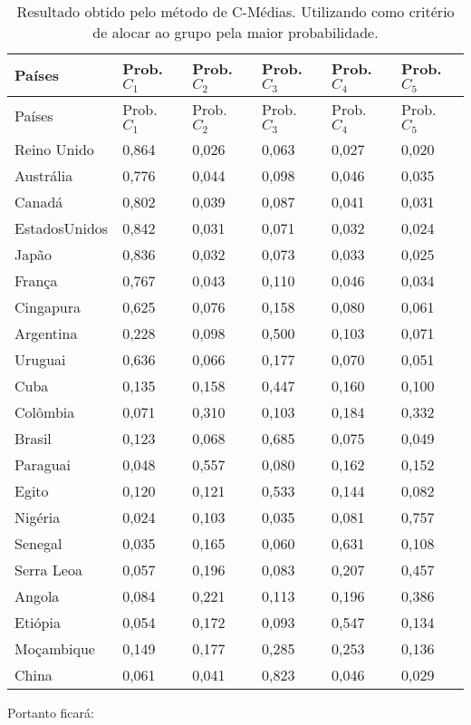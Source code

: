 \documentclass[
  openany]{book}
\begin{document}
\begin{longtable}[]{@{}llllll@{}}
\caption{\label{tab:excmeans} Resultado obtido pelo método de C-Médias. Utilizando como critério de alocar ao grupo pela maior probabilidade.}\tabularnewline
\toprule
Países & Prob. \(C_1\) & Prob. \(C_2\) & Prob. \(C_3\) & Prob. \(C_4\) & Prob. \(C_5\)\tabularnewline
\midrule
\endfirsthead
\toprule
Países & Prob. \(C_1\) & Prob. \(C_2\) & Prob. \(C_3\) & Prob. \(C_4\) & Prob. \(C_5\)\tabularnewline
\midrule
\endhead
Reino Unido & 0,864 & 0,026 & 0,063 & 0,027 & 0,020\tabularnewline
Austrália & 0,776 & 0,044 & 0,098 & 0,046 & 0,035\tabularnewline
Canadá & 0,802 & 0,039 & 0,087 & 0,041 & 0,031\tabularnewline
EstadosUnidos & 0,842 & 0,031 & 0,071 & 0,032 & 0,024\tabularnewline
Japão & 0,836 & 0,032 & 0,073 & 0,033 & 0,025\tabularnewline
França & 0,767 & 0,043 & 0,110 & 0,046 & 0,034\tabularnewline
Cingapura & 0,625 & 0,076 & 0,158 & 0,080 & 0,061\tabularnewline
Argentina & 0,228 & 0,098 & 0,500 & 0,103 & 0,071\tabularnewline
Uruguai & 0,636 & 0,066 & 0,177 & 0,070 & 0,051\tabularnewline
Cuba & 0,135 & 0,158 & 0,447 & 0,160 & 0,100\tabularnewline
Colômbia & 0,071 & 0,310 & 0,103 & 0,184 & 0,332\tabularnewline
Brasil & 0,123 & 0,068 & 0,685 & 0,075 & 0,049\tabularnewline
Paraguai & 0,048 & 0,557 & 0,080 & 0,162 & 0,152\tabularnewline
Egito & 0,120 & 0,121 & 0,533 & 0,144 & 0,082\tabularnewline
Nigéria & 0,024 & 0,103 & 0,035 & 0,081 & 0,757\tabularnewline
Senegal & 0,035 & 0,165 & 0,060 & 0,631 & 0,108\tabularnewline
Serra Leoa & 0,057 & 0,196 & 0,083 & 0,207 & 0,457\tabularnewline
Angola & 0,084 & 0,221 & 0,113 & 0,196 & 0,386\tabularnewline
Etiópia & 0,054 & 0,172 & 0,093 & 0,547 & 0,134\tabularnewline
Moçambique & 0,149 & 0,177 & 0,285 & 0,253 & 0,136\tabularnewline
China & 0,061 & 0,041 & 0,823 & 0,046 & 0,029\tabularnewline
\bottomrule
\end{longtable}

Portanto ficará:
\end{document}
